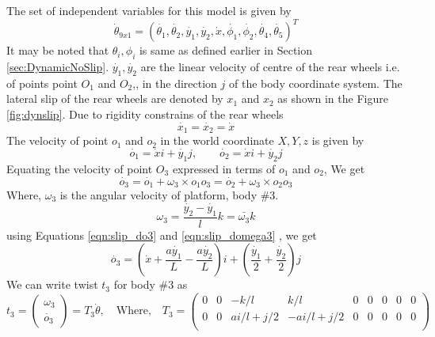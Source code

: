{The set of independent variables for this model is given by
\begin{equation}
\label{eqn:theta_slip}
\dot{\theta}_{9x1}=(\dot{\theta_1},\dot{\theta_2}, \dot{y_1},\dot{y_2},\dot{x},\dot{\phi_1},\dot{\phi_2},\dot{\theta_4},\dot{\theta_5})^T
\end{equation}
It may be noted that $\theta_i,\phi_i$  is same as defined earlier in Section \ref{sec:DynamicNoSlip}. $\dot{y_1},\dot{y_2}$ are the linear velocity of centre of the rear wheels i.e. of points point $O_1$ and $O_2$,, in the direction $j$ of the body coordinate system. The lateral slip of the rear wheels are denoted by $x_1$ and $x_2$ as shown in the Figure \ref{fig:dynslip}. Due to rigidity constrains of the rear wheels
\[\dot{x_1}=\dot{x_2}=\dot{x}\] 
The velocity of point $o_1$ and $ o_2$ in the world coordinate ${X,Y,z}$ is given by 
\begin{equation}
\label{eqn:slip_do1}
\dot{o_1}=\dot{x}i +\dot{y_1}j, \quad \quad  \dot{o_2}=\dot{x}i +\dot{y_2}j
\end{equation}
Equating the velocity of point $O_3$ expressed in terms of $o_1$ and $o_2$, We get
\begin{equation}
\label{eqn:slip_do3_rel}
\dot{o_3}=\dot{o_1}+\omega_3\times o_1o_3=\dot{o_2}+\omega_3\times o_2o_3
\end{equation}
Where, $\omega_3$ is the angular velocity of platform, body \#3.
\begin{equation}
	\label{eqn:slip_domega3}
	\omega_3=\frac{\dot{y_2}-\dot{y_1}}{l} k =\bar{\omega_3}k
\end{equation}
using Equations \ref{eqn:slip_do3} and \ref{eqn:slip_domega3} , we get
\begin{equation}
\label{eqn:slip_do3}
\dot{o_3}=(\dot{x}+\frac{a\dot{y_1}}{L}-\frac{a \dot{y_2}}{L})i+(\frac{\dot{y_1}}{2}+\frac{\dot{y_2}}{2})j
\end{equation}
We can write twist $t_3$ for body \#3 as
\begin{equation}
\label{eqn:slip_t3}
t_3=
\begin{pmatrix}
\omega_3\\
\dot{o_3}
\end{pmatrix}=T_3 \dot{\theta}, \quad \text{Where,} \quad 
T_3=
\begin{pmatrix}
0 & 0& -k/l & k/l & 0 &0 & 0 &0 &0\\
0 & 0& ai/l+ j/2& -ai/l+j/2 & 0 &0 & 0 &0 &0\\ 
\end{pmatrix}
\end{equation}
}
